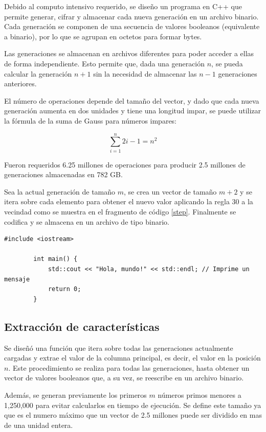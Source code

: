 \documentclass[12pt,twoside]{article}
\begin{document}
	Debido al computo intensivo requerido, se diseño un programa en C++ que permite generar, cifrar y almacenar cada nueva generación en un archivo binario. Cada generación se componen de una secuencia de valores booleanos (equivalente a binario), por lo que se agrupan en octetos para formar bytes.
	
	Las generaciones se almacenan en archivos diferentes para poder acceder a ellas de forma independiente. Esto permite que, dada una generación $n$, se pueda calcular la generación $n + 1$ sin la necesidad de almacenar las $n - 1$ generaciones anteriores. 
	
	El número de operaciones depende del tamaño del vector, y dado que cada nueva generación aumenta en dos unidades y tiene una longitud impar, se puede utilizar la fórmula de la suma de Gauss para números impares:
	
	\begin{equation*}
		\sum_{i = 1}^{n} 2i - 1 = n^2
	\end{equation*}
	
	Fueron requeridos 6.25 millones de operaciones para producir 2.5 millones de generaciones almacenadas en 782 GB.
	
	Sea la actual generación de tamaño $m$, se crea un vector de tamaño $m + 2$ y se itera sobre cada elemento para obtener el nuevo valor aplicando la regla 30 a la vecindad como se muestra en el fragmento de código \ref{step}. Finalmente se codifica y se almacena en un archivo de tipo binario.
	
	\begin{lstlisting}[style=modernCpp, caption=Ejemplo de código en C++,  label=step]
		#include <iostream>
		
		int main() {
			std::cout << "Hola, mundo!" << std::endl; // Imprime un mensaje
			return 0;
		}
	\end{lstlisting}
	
	\subsection{Extracción de características}
	
	Se diseñó una función que itera sobre todas las generaciones actualmente cargadas y extrae el valor de la columna principal, es decir, el valor en la posición $n$. Este procedimiento se realiza para todas las generaciones, hasta obtener un vector de valores booleanos que, a su vez, se reescribe en un archivo binario.
	
	Además, se generan previamente los primeros $m$ números primos menores a 1,250,000 para evitar calcularlos en tiempo de ejecución. Se define este tamaño ya que es el numero máximo que un vector de 2.5 millones puede ser dividido en mas de una unidad entera.
	
\end{document}
